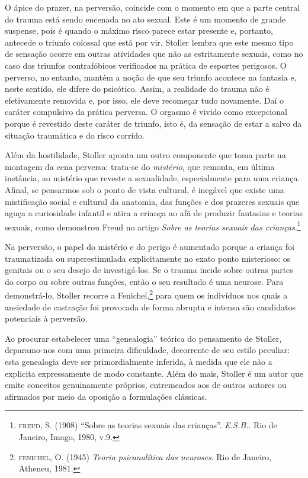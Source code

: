 O ápice do prazer, na perversão, coincide com o momento em que a parte
central do trauma está sendo encenada no ato sexual. Este é um momento
de grande suspense, pois é quando o máximo risco parece estar presente
e, portanto, antecede o triunfo colossal que está por vir. Stoller
lembra que este mesmo tipo de sensação ocorre em outras atividades que
não as estritamente sexuais, como no caso dos triunfos contrafóbicos
verificados na prática de esportes perigosos. O perverso, no entanto,
mantém a noção de que seu triunfo acontece na fantasia e, neste sentido,
ele difere do psicótico. Assim, a realidade do trauma não é efetivamente
removida e, por isso, ele deve recomeçar tudo novamente. Daí o caráter
compulsivo da prática perversa. O orgasmo é vivido como excepcional
porque é revestido deste caráter de triunfo, isto é, da sensação de
estar a salvo da situação traumática e do risco corrido.

Além da hostilidade, Stoller aponta um outro componente que toma parte
na montagem da cena perversa: trata-se do \emph{mistério}, que remonta,
em última instância, ao mistério que reveste a sexualidade,
especialmente para uma criança. Afinal, se pensarmos sob o ponto de
vista cultural, é inegável que existe uma mistificação social e cultural
da anatomia, das funções e dos prazeres sexuais que aguça a curiosidade
infantil e atira a criança ao afã de produzir fantasias e teorias
sexuais, como demonstrou Freud no artigo \emph{Sobre as teorias sexuais
das crianças}.\footnote{\textsc{freud}, S. (1908) ``Sobre as teorias
  sexuais das crianças''. \emph{E.S.B.}. Rio de Janeiro, Imago, 1980,
  v.9.}

Na perversão, o papel do mistério e do perigo é aumentado porque a
criança foi traumatizada ou superestimulada explicitamente no exato
ponto misterioso: os genitais ou o seu desejo de investigá-los. Se o
trauma incide sobre outras partes do corpo ou sobre outras funções,
então o seu resultado é uma neurose. Para demonstrá-lo, Stoller recorre
a Fenichel,\footnote{\textsc{fenichel}, O. (1945) \emph{Teoria
  psicanalítica das neuroses}. Rio de Janeiro, Atheneu, 1981.} para quem
os indivíduos nos quais a ansiedade de castração foi provocada de forma
abrupta e intensa são candidatos potenciais à perversão.

Ao procurar estabelecer uma ``genealogia'' teórica do pensamento de
Stoller, deparamo-nos com uma primeira dificuldade, decorrente de seu
estilo peculiar: esta genealogia deve ser primordialmente inferida, à
medida que ele não a explicita expressamente de modo constante. Além do
mais, Stoller é um autor que emite conceitos genuinamente próprios,
entremeados aos de outros autores ou afirmados por meio da oposição a
formulações clássicas.

